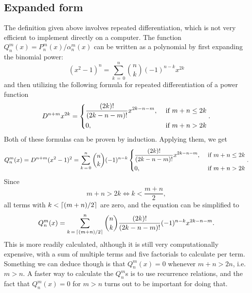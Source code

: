 \documentclass[12pt]{article}
\begin{document}
\subsection{Expanded form}
The definition given above involves repeated differentiation, which is not very efficient to implement directly on a computer. The function $Q_n^m(x)=P_n^m(x)/\alpha_n^m(x)$ can be written as a polynomial by first expanding the binomial power:
\begin{equation}
  (x^2 - 1)^n = \displaystyle\sum_{k\,=\,0}^{n}{n\choose k}(-1)^{n-k}x^{2k}
\end{equation}
and then utilizing the following formula for repeated differentiation of a power function
\begin{equation}
  D^{n+m}x^{2k} = \begin{dcases}
    \frac{(2k)!}{(2k-n-m)!}x^{2k-n-m}, &\text{ if }m + n \leq 2k\\
    0, &\text{ if }m + n > 2k
  \end{dcases}.
\end{equation}
Both of these formulas can be proven by induction. Applying them, we get 
\begin{equation}
  Q_n^m(x) = D^{n+m}(x^2 - 1)^2 = \sum_{k\,=\,0}^{n}{n\choose k}(-1)^{n-k}\begin{dcases}
    \frac{(2k)!}{(2k-n-m)!}x^{2k-n-m}, &\text{ if }m + n \leq 2k\\
    0, &\text{ if }m + n > 2k
  \end{dcases}.
\end{equation}
Since
\begin{equation}
  m + n > 2k \iff k < \frac{m+n}{2},
\end{equation}
all terms with $k<\lceil(m+n)/2\rceil$ are zero, and the equation can be simplified to
\begin{equation}
  Q_n^m(x) = \sum_{k\,=\,\lceil(m+n)/2\rceil}^{n}{n\choose k}\frac{(2k)!}{(2k-n-m)!}(-1)^{n-k}x^{2k-n-m}.
\end{equation}
This is more readily calculated, although it is still very computationally expensive, with a sum of multiple terms and five factorials to calculate per term. Something we can deduce though is that $Q_n^m(x)=0$ whenever $m+n>2n$, i.e. $m > n$. A faster way to calculate the $Q_n^m$s is to use recurrence relations, and the fact that $Q_n^m(x)=0$ for $m>n$ turns out to be important for doing that.
\end{document}
